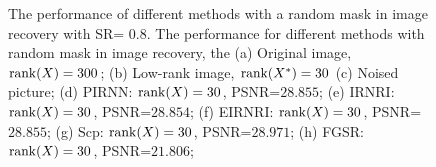 \documentclass[twoside,11pt]{article}
\numberwithin{equation}{section}
\begin{document}
\begin{figure}[hbtp]
{    
  }
  \captionsetup{singlelinecheck=off, justification=raggedright}
  \caption{The performance of different methods with a random mask in image recovery with SR= $0.8$. 
    The performance for different methods with random mask in image recovery, the  
    (a) Original image, ${\rm rank}(X) = 300$; 
    (b) Low-rank image, ${\rm rank}(X^{*}) = 30$
    (c) Noised picture; 
    (d) PIRNN:  ${\rm rank}(X) = 30$,  PSNR=$28.855$;
    (e) IRNRI:  ${\rm rank}(X) = 30$,  PSNR=$28.854$;   
    (f) EIRNRI: ${\rm rank}(X) = 30$,  PSNR=$28.855$;    
    (g) Scp:    ${\rm rank}(X) = 30$,  PSNR=$28.971$;   
    (h) FGSR:   ${\rm rank}(X) = 30$,  PSNR=$21.806$;   
  }
  \label{Relimg_Lena}
\end{figure}
\end{document}
